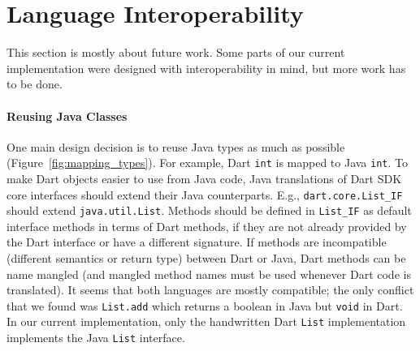 \documentclass[sigplan]{acmart}
\begin{document}
\section{Language Interoperability}
\label{sec:interop}
This section is mostly about future work. Some parts of our current implementation were designed with interoperability in mind, but more work has to be done.

\paragraph{Reusing Java Classes}
One main design decision is to reuse Java types as much as possible (Figure~\ref{fig:mapping_types}). For example, Dart \texttt{int} is mapped to Java \texttt{int}. To make Dart objects easier to use from Java code, Java translations of Dart SDK core interfaces should extend their Java counterparts. E.g., \texttt{dart.core.List\_IF} should extend \texttt{java.util.List}. Methods should be defined in \texttt{List\_IF} as default interface methods in terms of Dart methods, if they are not already provided by the Dart interface or have a different signature. If methods are incompatible (different semantics or return type) between Dart or Java, Dart methods can be name mangled (and mangled method names must be used whenever Dart code is translated). It seems that both languages are mostly compatible; the only conflict that we found was \texttt{List.add} which returns a boolean in Java but \texttt{void} in Dart. In our current implementation, only the handwritten Dart \texttt{List} implementation implements the Java \texttt{List} interface.
\end{document}
